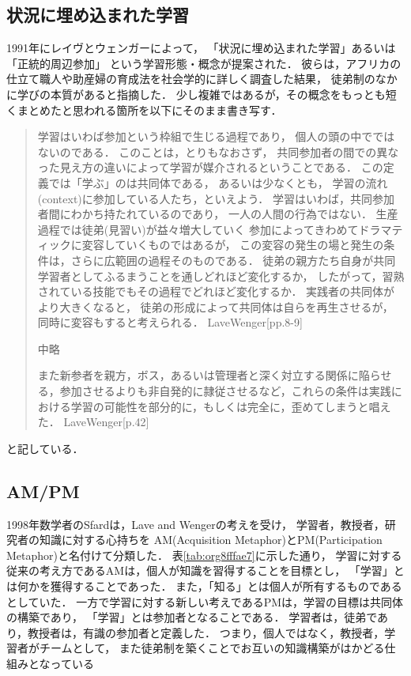 \documentclass[a4,p11]{article}
\begin{document}
\subsection{状況に埋め込まれた学習}
\label{sec:orga3e250e}
1991年にレイヴとウェンガーによって，
  「状況に埋め込まれた学習」あるいは「正統的周辺参加」
  という学習形態・概念が提案された．
  彼らは，アフリカの仕立て職人や助産婦の育成法を社会学的に詳しく調査した結果，
  徒弟制のなかに学びの本質があると指摘した．
少し複雑ではあるが，その概念をもっとも短くまとめたと思われる箇所を以下にそのまま書き写す．
\begin{quote}
学習はいわば参加という枠組で生じる過程であり，
個人の頭の中でではないのである．
このことは，とりもなおさず，
共同参加者の間での異なった見え方の違いによって学習が媒介されるということである．
この定義では「学ぶ」のは共同体である，
あるいは少なくとも，
学習の流れ(context)に参加している人たち，といえよう．
学習はいわば，共同参加者間にわかち持たれているのであり，
一人の人間の行為ではない．
生産過程では徒弟(見習い)が益々増大していく
参加によってきわめてドラマティックに変容していくものではあるが，
この変容の発生の場と発生の条件は，さらに広範囲の過程そのものである．
徒弟の親方たち自身が共同学習者としてふるまうことを通しどれほど変化するか，
したがって，習熟されている技能でもその過程でどれほど変化するか．
実践者の共同体がより大きくなると，
徒弟の形成によって共同体は自らを再生させるが，
同時に変容もすると考えられる．
LaveWenger[pp.8-9]

中略

また新参者を親方，ボス，あるいは管理者と深く対立する関係に陥らせる，参加させるよりも非自発的に隷従させるなど，これらの条件は実践における学習の可能性を部分的に，もしくは完全に，歪めてしまうと唱えた．
 LaveWenger[p.42]
\end{quote}
と記している．

\subsection{AM/PM}
\label{sec:org7c7c4c1}
1998年数学者のSfardは，Lave and Wengerの考えを受け，
学習者，教授者，研究者の知識に対する心持ちを
AM(Acquisition Metaphor)とPM(Participation Metaphor)と名付けて分類した．
表\ref{tab:org8fffae7}に示した通り，
学習に対する従来の考え方であるAMは，個人が知識を習得することを目標とし，
「学習」とは何かを獲得することであった．
また，「知る」とは個人が所有するものであるとしていた．
一方で学習に対する新しい考えであるPMは，学習の目標は共同体の構築であり，
「学習」とは参加者となることである．
学習者は，徒弟であり，教授者は，有識の参加者と定義した．
つまり，個人ではなく，教授者，学習者がチームとして，
また徒弟制を築くことでお互いの知識構築がはかどる仕組みとなっている
\end{document}
